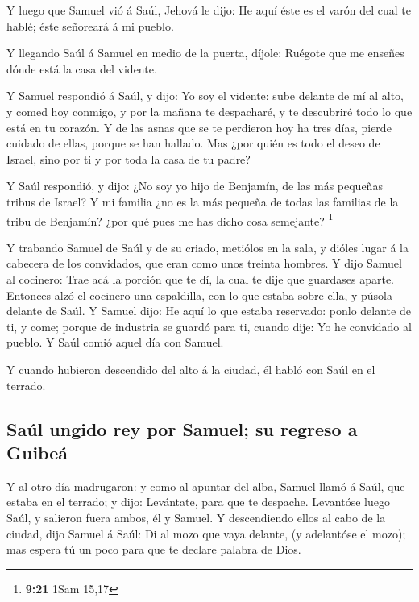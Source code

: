  Y luego que Samuel vió á Saúl, Jehová le dijo: He aquí
éste es el varón del cual te hablé; éste señoreará á mi pueblo.

 Y llegando Saúl á Samuel en medio de la puerta, díjole:
Ruégote que me enseñes dónde está la casa del vidente.

 Y Samuel respondió á Saúl, y dijo: Yo soy el vidente:
sube delante de mí al alto, y comed hoy conmigo, y por la mañana te
despacharé, y te descubriré todo lo que está en tu corazón.
 Y de las asnas que se te perdieron hoy ha tres días,
pierde cuidado de ellas, porque se han hallado. Mas ¿por quién es todo
el deseo de Israel, sino por ti y por toda la casa de tu padre?

 Y Saúl respondió, y dijo: ¿No soy yo hijo de Benjamín,
de las más pequeñas tribus de Israel? Y mi familia ¿no es la más pequeña
de todas las familias de la tribu de Benjamín? ¿por qué pues me has
dicho cosa semejante? \footnote{\textbf{9:21} 1Sam 15,17}

 Y trabando Samuel de Saúl y de su criado, metiólos en la
sala, y dióles lugar á la cabecera de los convidados, que eran como unos
treinta hombres.  Y dijo Samuel al cocinero: Trae acá la
porción que te dí, la cual te dije que guardases aparte. 
Entonces alzó el cocinero una espaldilla, con lo que estaba sobre ella,
y púsola delante de Saúl. Y Samuel dijo: He aquí lo que estaba
reservado: ponlo delante de ti, y come; porque de industria se guardó
para ti, cuando dije: Yo he convidado al pueblo. Y Saúl comió aquel día
con Samuel.

 Y cuando hubieron descendido del alto á la ciudad, él
habló con Saúl en el terrado.

\hypertarget{sauxfal-ungido-rey-por-samuel-su-regreso-a-guibeuxe1}{%
\subsection{Saúl ungido rey por Samuel; su regreso a
Guibeá}\label{sauxfal-ungido-rey-por-samuel-su-regreso-a-guibeuxe1}}

 Y al otro día madrugaron: y como al apuntar del alba,
Samuel llamó á Saúl, que estaba en el terrado; y dijo: Levántate, para
que te despache. Levantóse luego Saúl, y salieron fuera ambos, él y
Samuel.  Y descendiendo ellos al cabo de la ciudad, dijo
Samuel á Saúl: Di al mozo que vaya delante, (y adelantóse el mozo); mas
espera tú un poco para que te declare palabra de Dios.


